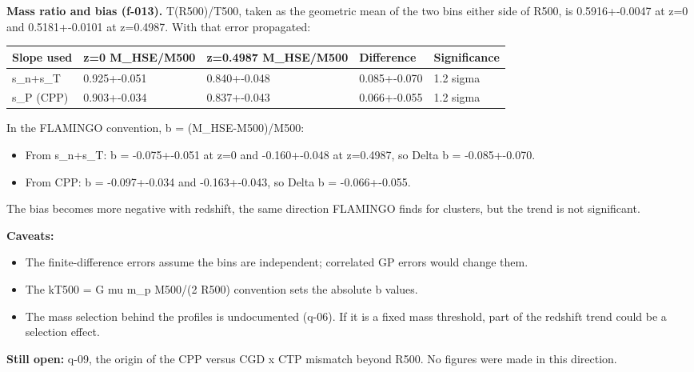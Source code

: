 \documentclass[11pt,a4paper]{article}
\begin{document}
\textbf{Mass ratio and bias (f-013).} T(R500)/T500, taken as the geometric mean of the two bins either side of R500, is 0.5916+-0.0047 at z=0 and 0.5181+-0.0101 at z=0.4987. With that error propagated:

\begin{longtable}{@{}p{}p{}p{}p{}p{}@{}}
\toprule
\textbf{Slope used} & \textbf{z=0 M\_HSE/M500} & \textbf{z=0.4987 M\_HSE/M500} & \textbf{Difference} & \textbf{Significance} \\ \midrule \endhead
s\_n+s\_T & 0.925+-0.051 & 0.840+-0.048 & 0.085+-0.070 & 1.2 sigma \\
s\_P (CPP) & 0.903+-0.034 & 0.837+-0.043 & 0.066+-0.055 & 1.2 sigma \\
\bottomrule\end{longtable}
In the FLAMINGO convention, b = (M\_HSE-M500)/M500:

\begin{itemize}
  \item From s\_n+s\_T: b = -0.075+-0.051 at z=0 and -0.160+-0.048 at z=0.4987, so Delta b = -0.085+-0.070.
  \item From CPP: b = -0.097+-0.034 and -0.163+-0.043, so Delta b = -0.066+-0.055.
\end{itemize}
The bias becomes more negative with redshift, the same direction FLAMINGO finds for clusters, but the trend is not significant.

\textbf{Caveats:}

\begin{itemize}
  \item The finite-difference errors assume the bins are independent; correlated GP errors would change them.
  \item The kT500 = G mu m\_p M500/(2 R500) convention sets the absolute b values.
  \item The mass selection behind the profiles is undocumented (q-06). If it is a fixed mass threshold, part of the redshift trend could be a selection effect.
\end{itemize}
\textbf{Still open:} q-09, the origin of the CPP versus CGD x CTP mismatch beyond R500. No figures were made in this direction.
\end{document}
